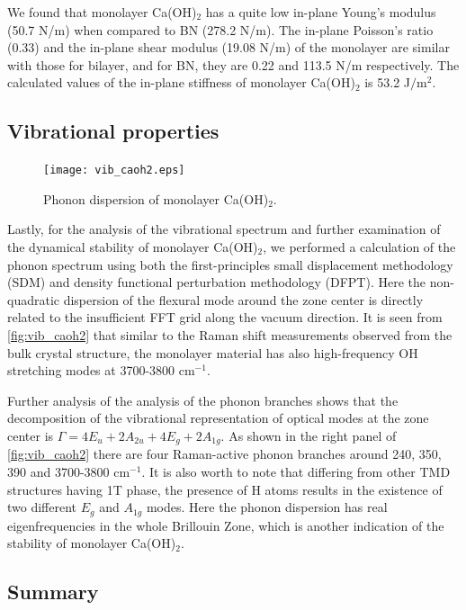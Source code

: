 We found that monolayer Ca(OH)$_2$ has a quite low in-plane Young's modulus 
(50.7 N/m) when compared to BN (278.2 N/m). The in-plane Poisson's ratio (0.33) 
and the in-plane shear modulus (19.08 N/m) of the monolayer are similar with 
those for bilayer, and for BN, they are 0.22 and 113.5 N/m respectively. The 
calculated values of the in-plane stiffness of monolayer Ca(OH)$_{2}$ is 53.2 
J$/$m$^{2}$. 

\subsection{Vibrational properties}\label{stability}
\begin{figure}[htbp]
\centering
\texttt{[image: vib\_caoh2.eps]}
\caption{\label{fig:vib_caoh2} Phonon dispersion of monolayer Ca(OH)$_2$.}
\end{figure}

Lastly, for the analysis of the vibrational spectrum and further examination of 
the dynamical stability of monolayer Ca(OH)$_2$, we performed a 
calculation of the phonon spectrum using both the first-principles small 
displacement methodology (SDM)\cite{alfe} and density functional perturbation 
methodology (DFPT)\cite{baroni}. Here the non-quadratic dispersion of the 
flexural mode around the zone center is directly related to the insufficient 
FFT grid along the vacuum direction. It is seen from \autoref{fig:vib_caoh2} that 
similar to the Raman shift measurements observed from the bulk crystal 
structure, the monolayer material has also high-frequency OH stretching 
modes at 3700-3800 cm$^{-1}$. 

Further analysis of the analysis of the phonon 
branches shows that the decomposition of the vibrational representation of optical 
modes at the zone center is $\Gamma = 4E_{u} + 2A_{2u} + 4E_{g} + 2A_{1g}$. As 
shown in the right panel of \autoref{fig:vib_caoh2} there are four Raman-active phonon 
branches around 240, 350, 390 and 3700-3800 cm$^{-1}$. It is also worth to note 
that differing from other TMD structures having 1T phase, the presence of H atoms 
results in the existence of two different $E_{g}$ and $A_{1g}$ modes. Here the 
phonon dispersion has real eigenfrequencies in the whole Brillouin Zone, 
which is another indication of the stability of monolayer Ca(OH)$_2$.

\subsection{Summary}\label{disc}


